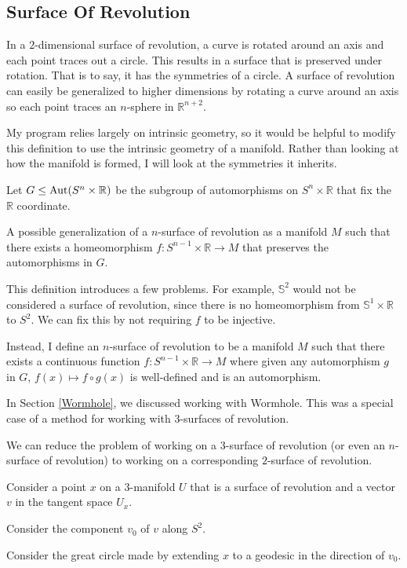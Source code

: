 \subsection{Surface Of Revolution}

In a $2$-dimensional surface of revolution, a curve is rotated around an axis and each point traces out a circle. This results in a surface that is preserved under rotation. That is to say, it has the symmetries of a circle. A surface of revolution can easily be generalized to higher dimensions by rotating a curve around an axis so each point traces an $n$-sphere in $\mathbb{R}^{n+2}$.

My program relies largely on intrinsic geometry, so it would be helpful to modify this definition to use the intrinsic geometry of a manifold. Rather than looking at how the manifold is formed, I will look at the symmetries it inherits.

Let $G \leq \operatorname*{Aut}(S^n \times \mathbb{R})$ be the subgroup of automorphisms on $S^n \times \mathbb{R}$ that fix the $\mathbb{R}$ coordinate.

A possible generalization of a $n$-surface of revolution as a manifold $M$ such that there exists a homeomorphism $f:S^{n-1} \times \mathbb{R} \to M$ that preserves the automorphisms in $G$.

This definition introduces a few problems. For example, $\mathbb{S}^2$ would not be considered a surface of revolution, since there is no homeomorphism from $\mathbb{S}^1 \times \mathbb{R}$ to $S^2$. We can fix this by not requiring $f$ to be injective.

Instead, I define an $n$-surface of revolution to be a manifold $M$ such that there exists a continuous function $f:S^{n-1} \times \mathbb{R} \to M$ where given any automorphism $g$ in $G$, $f(x) \mapsto f \circ g(x)$ is well-defined and is an automorphism.

In Section \ref{Wormhole}, we discussed working with Wormhole. This was a special case of a method for working with $3$-surfaces of revolution.

We can reduce the problem of working on a $3$-surface of revolution (or even an $n$-surface of revolution) to working on a corresponding $2$-surface of revolution.

Consider a point $x$ on a $3$-manifold $U$ that is a surface of revolution and a vector $v$ in the tangent space $U_x$.

Consider the component $v_0$ of $v$ along $S^2$.

Consider the great circle made by extending $x$ to a geodesic in the direction of $v_0$.

